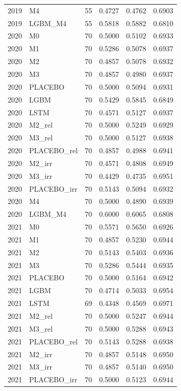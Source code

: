 \begin{tabular}{llrrrr}
2019 & M4 & 55 & 0.4727 & 0.4762 & 0.6903 \\
2019 & LGBM\_M4 & 55 & 0.5818 & 0.5882 & 0.6810 \\
2020 & M0 & 70 & 0.5000 & 0.5102 & 0.6933 \\
2020 & M1 & 70 & 0.5286 & 0.5078 & 0.6937 \\
2020 & M2 & 70 & 0.4857 & 0.5078 & 0.6932 \\
2020 & M3 & 70 & 0.4857 & 0.4980 & 0.6937 \\
2020 & PLACEBO & 70 & 0.5000 & 0.5094 & 0.6931 \\
2020 & LGBM & 70 & 0.5429 & 0.5845 & 0.6849 \\
2020 & LSTM & 70 & 0.4571 & 0.5127 & 0.6937 \\
2020 & M2\_rel & 70 & 0.5000 & 0.5249 & 0.6929 \\
2020 & M3\_rel & 70 & 0.5000 & 0.5127 & 0.6938 \\
2020 & PLACEBO\_rel & 70 & 0.4857 & 0.4988 & 0.6941 \\
2020 & M2\_irr & 70 & 0.4571 & 0.4808 & 0.6949 \\
2020 & M3\_irr & 70 & 0.4429 & 0.4735 & 0.6951 \\
2020 & PLACEBO\_irr & 70 & 0.5143 & 0.5094 & 0.6932 \\
2020 & M4 & 70 & 0.5000 & 0.4890 & 0.6939 \\
2020 & LGBM\_M4 & 70 & 0.6000 & 0.6065 & 0.6808 \\
2021 & M0 & 70 & 0.5571 & 0.5650 & 0.6926 \\
2021 & M1 & 70 & 0.4857 & 0.5230 & 0.6944 \\
2021 & M2 & 70 & 0.5143 & 0.5403 & 0.6936 \\
2021 & M3 & 70 & 0.5286 & 0.5444 & 0.6935 \\
2021 & PLACEBO & 70 & 0.5000 & 0.5164 & 0.6942 \\
2021 & LGBM & 70 & 0.4714 & 0.5033 & 0.6954 \\
2021 & LSTM & 69 & 0.4348 & 0.4569 & 0.6971 \\
2021 & M2\_rel & 70 & 0.5000 & 0.5247 & 0.6944 \\
2021 & M3\_rel & 70 & 0.5000 & 0.5288 & 0.6943 \\
2021 & PLACEBO\_rel & 70 & 0.5143 & 0.5288 & 0.6938 \\
2021 & M2\_irr & 70 & 0.4857 & 0.5148 & 0.6950 \\
2021 & M3\_irr & 70 & 0.4857 & 0.5140 & 0.6950 \\
2021 & PLACEBO\_irr & 70 & 0.5000 & 0.5123 & 0.6944 \\

\end{tabular}
